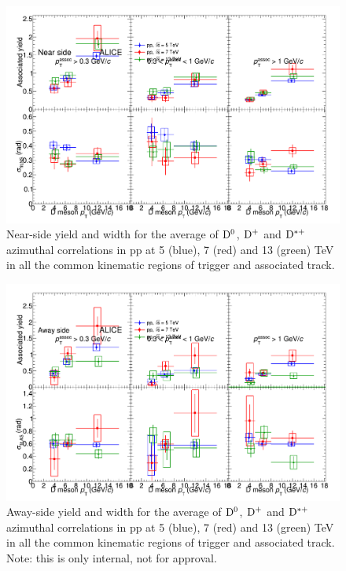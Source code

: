 \begin{figure}
\centering
\includegraphics[width=.96\textwidth]{figures/ComparisonToOtherpp/CompareFitResults_DiffppEnergies.png}
\caption{Near-side yield and width for the average of ${\rm D^0}$, ${\rm D^+}$ and ${\rm D^{*+}}$ azimuthal correlations in pp at 5 (blue), 7 (red) and 13 (green) TeV in all the common kinematic regions of trigger and associated track.}
\label{fig:AllppFit1}
\end{figure}


\begin{figure}
\centering
\includegraphics[width=.96\textwidth]{figures/ComparisonToOtherpp/CompareFitResults_DiffppEnergies_AwaySide.png}
\caption{Away-side yield and width for the average of ${\rm D^0}$, ${\rm D^+}$ and ${\rm D^{*+}}$ azimuthal correlations in pp at 5 (blue), 7 (red) and 13 (green) TeV in all the common kinematic regions of trigger and associated track. Note: this is only internal, not for approval.}
\label{fig:AllppFit2}
\end{figure}

